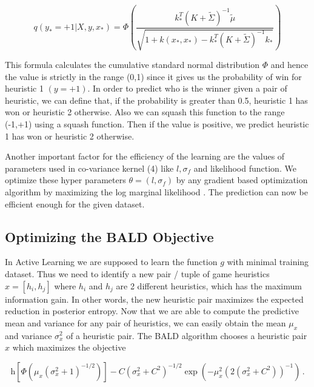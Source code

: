 \documentclass{scrartcl}
\begin{document}
{\begin{equation}
q(y_*=+1|X,y,x_*) = \Phi(\dfrac{k_*^{T}(K + \widetilde{\Sigma})^{-1}\widetilde{\mu}}{\sqrt{1+  k(x_*,x_*) -  k_*^{T}(K + \widetilde{\Sigma})^{-1} k_*}})
\end{equation}


This formula calculates the cumulative standard normal distribution $\Phi$ and hence the value is strictly in the range (0,1) since it gives us the probability of win for heuristic 1 $(y=+1)$. In order to predict who is the winner given a pair of heuristic, we can define that, if the probability is greater than 0.5, heuristic 1 has won or heuristic 2 otherwise. Also we can squash this function to the range (-1,+1) using a squash function. Then if the value is positive, we predict heuristic 1 has won or heuristic 2 otherwise.

Another important factor for the efficiency of the learning are the values of parameters used in co-variance kernel (4) like $l,\sigma_f$ and likelihood function. We optimize these hyper parameters $\theta =( l,\sigma_f)$ by any gradient based optimization algorithm by maximizing the log marginal likelihood \cite{chu2005preference}. The prediction can now be efficient enough for the given dataset.



\subsection {Optimizing the BALD Objective}
In Active Learning we are supposed to learn the function $g$ with minimal training dataset. Thus we need to identify a new pair / tuple of game heuristics $x = [ h_i , h_j]$ where $h_i$ and $h_j$ are 2 different heuristics, which has the maximum information gain. In other words, the new heuristic pair maximizes the expected reduction in posterior entropy. Now that we are able to compute the predictive mean and variance for any pair of heuristics, we can easily obtain the mean $\mu_x$ and variance $\sigma_x^2$ of a heuristic pair. The BALD algorithm \cite{houlsby2012collaborative} chooses a heuristic pair $x$ which maximizes the objective

\hfill 

\vspace{-0.5cm}
{\small
\begin{equation}
\mathrm{h} \left[ \Phi\left( \mu_x(\sigma_x^2 + 1)^{-1/2} \right)\right] -
C(\sigma_x^2 + C^2)^{-1/2} \exp\left(-\mu_x^2(2\left(\sigma_x^2+ C^2\right))^{-1}\right)\,.\label{eqn:BALD}
\end{equation}
}

}
\end{document}

